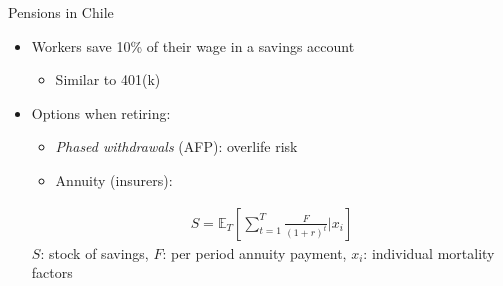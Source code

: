 \documentclass[10pt,aspectratio=169]{beamer}
\begin{document}
\begin{frame}{}
    
\end{frame}




\begin{frame}{Pensions in Chile}    
    \begin{itemize}%
        \item Workers save 10\% of their wage in a savings account 

        \begin{itemize}
            \item Similar to 401(k)
        \end{itemize} 
        
        \item Options when retiring: 
        \begin{itemize}
            \item \textit{Phased withdrawals} (AFP): overlife risk

            \item Annuity (insurers): 
        \end{itemize}
         \begin{align*}
     S = \mathbb{E}_{T} \left[\sum_{t=1}^T\frac{F}{(1+r)^t}| x_i\right]
 \end{align*}
 $S$: stock of savings, $F$: per period annuity payment, $x_i$: individual mortality factors
\end{itemize} 
\end{frame}


\end{document}
